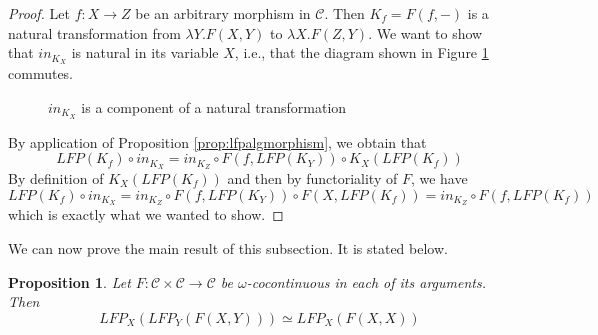 \documentclass{msthesis}
\newtheorem{prop}[theorem]{Proposition}
\theoremstyle{definition}
\newcommand{\mcC}{\mathcal{C}}
\begin{document}
\begin{proof}
    Let $f : X \to Z$ be an arbitrary morphism in $\mcC$.  Then $K_f = F(f, -)$ is a natural transformation from $\lambda Y.F(X, Y)$ to $\lambda X.F(Z, Y)$.  We want to show that $in_{K_X}$ is natural in its variable $X$, i.e., that the diagram shown in Figure \ref{fig:inisnatural} commutes.

    \begin{figure}[htbp]
        \caption{$in_{K_X}$ is a component of a natural transformation}
        \label{fig:inisnatural}
    \end{figure}

    By application of Proposition \ref{prop:lfpalgmorphism}, we obtain that
    \[ LFP(K_f) \circ in_{K_X} = in_{K_Z} \circ F(f, LFP(K_Y)) \circ K_X(LFP(K_f)) \]
    By definition of $K_X(LFP(K_f))$ and then by functoriality of $F$, we have
    \[ LFP(K_f) \circ in_{K_X} = in_{K_Z} \circ F(f, LFP(K_Y)) \circ F(X, LFP(K_f)) = in_{K_Z} \circ F(f, LFP(K_f)) \]
    which is exactly what we wanted to show.
\end{proof}

We can now prove the main result of this subsection.  It is stated below.

\begin{prop}\label{prop:iteratedlfp}
    Let $F : \mcC \times \mcC \to \mcC$ be $\omega$-cocontinuous in each of its arguments.  Then
    \begin{equation}
    \label{eq:LFPXY}
    LFP_X(LFP_Y(F(X,Y))) \simeq LFP_X(F(X,X))
    \end{equation}
\end{prop}
\end{document}
